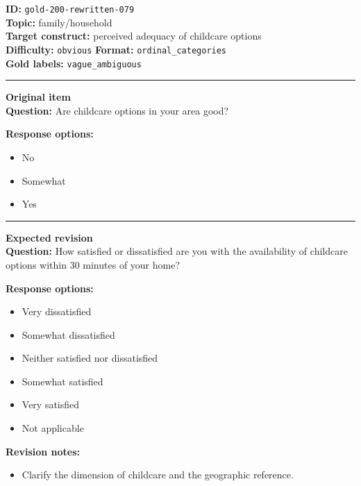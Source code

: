 \documentclass[10pt,a4paper]{article}
\newcommand{\sectionline}{\vspace{0.15em}\hrule\vspace{0.35em}}
\begin{document}
\begin{tcolorbox}[colframe=FlawRed,colback=white,colbacktitle=FlawRed!9,coltitle=black,title={Item 079\hfill Flawed item}]
\textbf{ID:} \texttt{gold-200-rewritten-079}\\
\textbf{Topic:} family/household\\
\textbf{Target construct:} perceived adequacy of childcare options\\
\textbf{Difficulty:} \texttt{obvious} \quad \textbf{Format:} \texttt{ordinal\_categories}\\
\textbf{Gold labels:} \texttt{vague\_ambiguous}\\
\sectionline
\textbf{Original item}\\
\textbf{Question:} Are childcare options in your area good?
\par\textbf{Response options:}
\begin{itemize}
\item No
\item Somewhat
\item Yes
\end{itemize}
\sectionline
\textbf{Expected revision}\\
\textbf{Question:} How satisfied or dissatisfied are you with the availability of childcare options within 30 minutes of your home?
\par\textbf{Response options:}
\begin{itemize}
\item Very dissatisfied
\item Somewhat dissatisfied
\item Neither satisfied nor dissatisfied
\item Somewhat satisfied
\item Very satisfied
\item Not applicable
\end{itemize}
\par\textbf{Revision notes:}
\begin{itemize}
\item Clarify the dimension of childcare and the geographic reference.
\end{itemize}
\end{tcolorbox}
\end{document}

